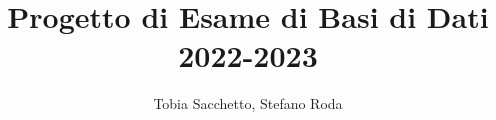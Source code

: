 
\title{Progetto di Esame di Basi di Dati 2022-2023}
\author{Tobia Sacchetto, Stefano Roda}
\begin{introduction}
    
\end{introduction}


